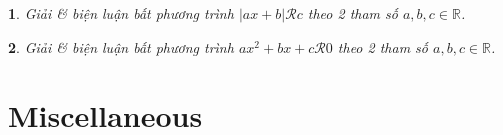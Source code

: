 \documentclass{article}
\newtheorem{baitoan}{}
\begin{document}
\begin{baitoan}
	Giải \& biện luận bất phương trình $|ax + b|\mathcal{R} c$ theo 2 tham số $a,b,c\in\mathbb{R}$.
\end{baitoan}

\begin{baitoan}
	Giải \& biện luận bất phương trình $ax^2 + bx + c\mathcal{R} 0$ theo 2 tham số $a,b,c\in\mathbb{R}$.
\end{baitoan}


\section{Miscellaneous}


\printbibliography[heading=bibintoc]
	
\end{document}
